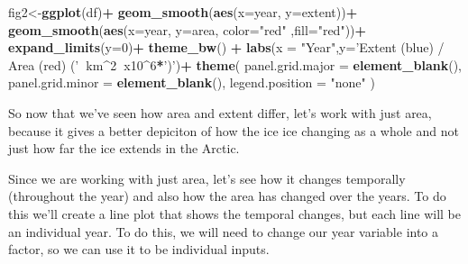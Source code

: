 \documentclass[]{article}
\newenvironment{Shaded}{\begin{snugshade}}{\end{snugshade}}
\newcommand{\KeywordTok}[1]{\textcolor[rgb]{0.13,0.29,0.53}{\textbf{#1}}}
\newcommand{\DataTypeTok}[1]{\textcolor[rgb]{0.13,0.29,0.53}{#1}}
\newcommand{\DecValTok}[1]{\textcolor[rgb]{0.00,0.00,0.81}{#1}}
\newcommand{\StringTok}[1]{\textcolor[rgb]{0.31,0.60,0.02}{#1}}
\newcommand{\OperatorTok}[1]{\textcolor[rgb]{0.81,0.36,0.00}{\textbf{#1}}}
\newcommand{\NormalTok}[1]{#1}
\begin{document}
\begin{Shaded}
\begin{Highlighting}[]
\NormalTok{fig2<-}\KeywordTok{ggplot}\NormalTok{(df)}\OperatorTok{+}
\StringTok{  }\KeywordTok{geom_smooth}\NormalTok{(}\KeywordTok{aes}\NormalTok{(}\DataTypeTok{x=}\NormalTok{year, }\DataTypeTok{y=}\NormalTok{extent))}\OperatorTok{+}
\StringTok{  }\KeywordTok{geom_smooth}\NormalTok{(}\KeywordTok{aes}\NormalTok{(}\DataTypeTok{x=}\NormalTok{year, }\DataTypeTok{y=}\NormalTok{area, }\DataTypeTok{color=}\StringTok{"red"}\NormalTok{ ,}\DataTypeTok{fill=}\StringTok{"red"}\NormalTok{))}\OperatorTok{+}
\StringTok{  }\KeywordTok{expand_limits}\NormalTok{(}\DataTypeTok{y=}\DecValTok{0}\NormalTok{)}\OperatorTok{+}
\StringTok{  }\KeywordTok{theme_bw}\NormalTok{() }\OperatorTok{+}
\StringTok{  }\KeywordTok{labs}\NormalTok{(}\DataTypeTok{x =} \StringTok{"Year"}\NormalTok{,}\DataTypeTok{y=}\StringTok{'Extent (blue) / Area (red) ('}\OperatorTok{~}\NormalTok{km}\OperatorTok{^}\DecValTok{2}\OperatorTok{~}\NormalTok{x10}\OperatorTok{^}\DecValTok{6}\OperatorTok{*}\StringTok{')'}\NormalTok{)}\OperatorTok{+}
\StringTok{  }\KeywordTok{theme}\NormalTok{(}
    \DataTypeTok{panel.grid.major =} \KeywordTok{element_blank}\NormalTok{(),}
    \DataTypeTok{panel.grid.minor =} \KeywordTok{element_blank}\NormalTok{(),}
    \DataTypeTok{legend.position =} \StringTok{"none"}
\NormalTok{  )}
\end{Highlighting}
\end{Shaded}

So now that we've seen how area and extent differ, let's work with just
area, because it gives a better depiciton of how the ice ice changing as
a whole and not just how far the ice extends in the Arctic.

Since we are working with just area, let's see how it changes temporally
(throughout the year) and also how the area has changed over the years.
To do this we'll create a line plot that shows the temporal changes, but
each line will be an individual year. To do this, we will need to change
our year variable into a factor, so we can use it to be individual
inputs.

\begin{Shaded}
\end{Shaded}
\end{document}

